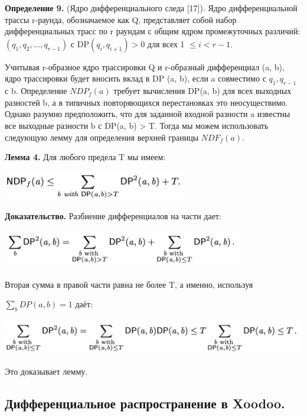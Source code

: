 \documentclass[utf8,14pt,a4paper,oneside,russian]{book}
\begin{document}
\textbf{Определение 9.} (Ядро дифференциального следа [17]). Ядро 
дифференциальной трассы r-раунда, обозначаемое как Q, представляет собой 
набор дифференциальных трасс по r раундам с общим ядром промежуточных 
различий: $(q_1, q_2, ..., q_{r-1})$ с DP$(q_i, q_{i+1}) > 0$ для всех 1 $\le i < r - 1$.

Учитывая r-образное ядро трассировки Q и r-образный дифференциал (a, b), 
ядро трассировки будет вносить вклад в DP (a, b), если a совместимо с 
$q_1, q_{r-1}$ с b.
Определение $NDP_f(a)$ требует вычисления DP(a, b) для всех выходных 
разностей b, а в типичных повторяющихся перестановках это неосуществимо. 
Однако разумно предположить, что для заданной входной разности a известны 
все выходные разности b с DP(a, b) > T. Тогда мы можем использовать 
следующую лемму для определения верхней границы $NDF_f(a)$.

\textbf{Лемма 4.} Для любого предела T мы имеем:

\includegraphics[width=8cm]{form23}

\textbf{Доказательство.} Разбиение дифференциалов на части дает:

\includegraphics[width=10.5cm]{form24}

Вторая сумма в правой части равна не более T, а именно, используя 

$\sum_b DP(a, b) = 1$ даёт:

\includegraphics[width=13.5cm]{form25}

Это доказывает лемму.

\subsection{Дифференциальное распространение в Xoodoo.}
\end{document}
